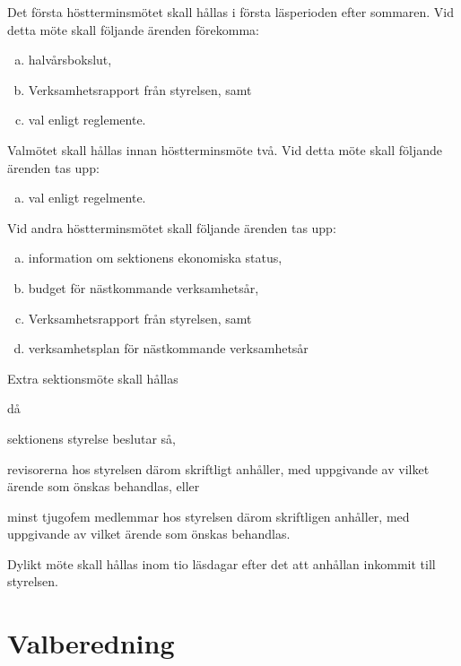 \documentclass[stadgar]{dsekprotokoll}
\begin{document}
\begin{stadgeavsnitt}

Det första höstterminsmötet skall hållas i första läsperioden efter sommaren. Vid detta möte skall följande ärenden förekomma:
\begin{enumerate}[a)]
\item halvårsbokslut, 
\item Verksamhetsrapport från styrelsen, samt
\item val enligt reglemente.
\end{enumerate}


Valmötet skall hållas innan höstterminsmöte två. Vid detta möte skall följande ärenden tas upp:
\begin{enumerate}[a)]
\item val enligt regelmente. 
\end{enumerate}


Vid andra höstterminsmötet skall följande ärenden tas upp:
\begin{enumerate}[a)]
\item information om sektionens ekonomiska status,
\item budget för nästkommande verksamhetsår, 
\item Verksamhetsrapport från styrelsen, samt
\item verksamhetsplan för nästkommande verksamhetsår
\end{enumerate}


Extra sektionsmöte skall hållas
\begin{fetlista}{då}
\item sektionens styrelse beslutar så,
\item revisorerna hos styrelsen därom skriftligt anhåller, med
  uppgivande av vilket ärende som önskas behandlas, eller
\item minst tjugofem medlemmar hos styrelsen därom skriftligen
  anhåller, med uppgivande av vilket ärende som önskas behandlas.
\end{fetlista}

Dylikt möte skall hållas inom tio läsdagar efter det att
anhållan inkommit till styrelsen.


\end{stadgeavsnitt}

\section{Valberedning}
\end{document}
